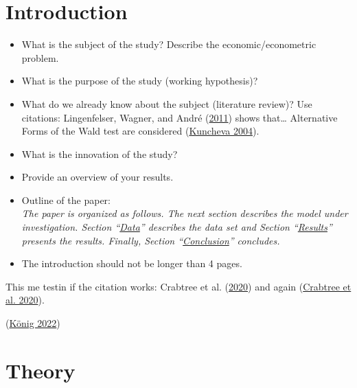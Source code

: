 \documentclass[a4paper,11pt]{article}
\begin{document}
\newpage
\listoftables
{}

\newpage
\pagestyle{plain}       
\setcounter{page}{1}    %

\hypertarget{introduction}{%
\section{Introduction}\label{introduction}}
\begin{itemize}
\item
  What is the subject of the study? Describe the economic/econometric problem.
\item
  What is the purpose of the study (working hypothesis)?
\item
  What do we already know about the subject (literature review)? Use citations:
  Lingenfelser, Wagner, and André (\protect\hyperlink{ref-lingenfelser2011systematic}{2011}) shows that\ldots{} Alternative Forms of the Wald test are
  considered (\protect\hyperlink{ref-kuncheva2004combining}{Kuncheva 2004}).
\item
  What is the innovation of the study?
\item
  Provide an overview of your results.
\item
  Outline of the paper:\\
  \emph{The paper is organized as follows. The next section describes the model
  under investigation. Section ``\protect\hyperlink{data}{Data}'' describes the data set
  and Section ``\protect\hyperlink{results}{Results}'' presents the results. Finally, Section
  ``\protect\hyperlink{conclusion}{Conclusion}'' concludes.}
\item
  The introduction should not be longer than 4 pages.
\end{itemize}
This me testin if the citation works: Crabtree et al. (\protect\hyperlink{ref-crabtreeItNotOnly2020}{2020}) and again
(\protect\hyperlink{ref-crabtreeItNotOnly2020}{Crabtree et al. 2020}).

(\protect\hyperlink{ref-konigEPINetzTwitterPoliticians2022}{König 2022})

\newpage

\hypertarget{theory}{%
\section{Theory}\label{theory}}
\end{document}
